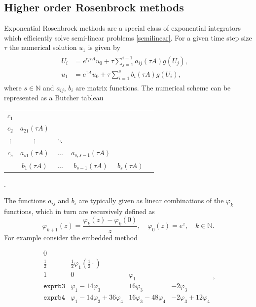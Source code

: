 \documentclass{scrartcl}
\begin{document}
	\subsection{Higher order Rosenbrock methods}
	Exponential Rosenbrock methods are a special class of exponential integrators which efficiently solve semi-linear problems \eqref{semilinear}. For a given time step size $\tau$ the numerical solution $u_1$ is given by
	\begin{align}
	\begin{split}
	U_{i} &= e^{c_i \tau A}u_0 + \tau\sum_{j=1}^{i-1}a_{ij}(\tau A)g(U_{j}), \quad \\
	u_{1} &= e^{    \tau A}u_0 + \tau\sum_{i=1}^{s}b_i(\tau A)g(U_{i}),
	\end{split}\label{exprbscheme}
	\end{align}
	where $s\in\mathbb{N}$ and $a_{ij}$, $b_{i}$ are matrix functions. The numerical scheme can be represented as a Butcher tableau
	\begin{table}[H]
		\centering
		\begin{tabular}{c|ccccc}
			$c_1$ &  &  &  & \\
			$c_2$ & $a_{21}(\tau A)$ &  &  & \\
			$\vdots$ & $\vdots$ &  $\ddots$  &  & \\
			$c_s$ & $a_{s1}(\tau A)$ & $\ldots$ & $a_{s,s-1}(\tau A)$  & \\
			\hline
			&$b_1(\tau A)$ & $\ldots$ & $b_{s-1}(\tau A)$ & $b_s(\tau A)$
		\end{tabular}
		.
	\end{table} \noindent The functions $a_{ij}$ and $b_{i}$ are typically given as linear combinations of the $\varphi_k$ functions, which in turn are recursively defined as 
	\[\varphi_{k+1}(z) = \frac{\varphi_k(z)-\varphi_k(0)}z, \quad \varphi_0(z) = e^z, \quad k\in\mathbb{N}.\]
	For example consider the embedded method
	\begin{table}[H]
		\vspace{-1em}
		\centering
		\renewcommand\arraystretch{1.2}
		\[
		\begin{array}
		{c|ccc}
		0\\
		\frac{1}{2} & \frac{1}{2}\varphi_1(\frac{1}{2}\cdot)\\
		1& 0& \varphi_1\\
		\hline
		\texttt{exprb3} & \varphi_1 - 14\varphi_3 & 16\varphi_3 & -2\varphi_3  \\
		\texttt{exprb4} & \varphi_1 - 14\varphi_3 + 36\varphi_4 & 16\varphi_3 -48\varphi_4 & -2\varphi_3 + 12\varphi_4 
		\end{array},
		\]
		\vspace{-2em}
	\end{table}
\end{document}
